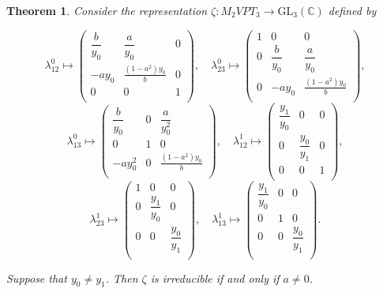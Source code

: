 \documentclass[preprint]{elsarticle}
\newtheorem{theorem}{Theorem}[section]
\begin{document}
\begin{theorem}
Consider the representation $\zeta: M_2VPT_3\longrightarrow \mathrm{GL}_{3}(\mathbb{C}) $  defined by

$$\lambda^0_{12}\mapsto\left(
\begin{array}{ccc}
 \dfrac{b}{y_0} & \dfrac{a}{y_0} & 0 \\
 -ay_0 & \frac{\left(1-a^2\right) y_0}{b} & 0 \\
 0 & 0 & 1 \\
\end{array}
\right),\quad
\lambda^0_{23}\mapsto\left(
\begin{array}{ccc}
 1 & 0 & 0 \\
 0 & \dfrac{b}{y_0} & \dfrac{a}{y_0} \\
 0 & -a y_0 & \frac{\left(1-a^2\right) y_0}{b} \\
\end{array}
\right),$$
$$\lambda^0_{13}\mapsto
\left(
\begin{array}{ccc}
 \dfrac{b}{y_0} & 0 & \dfrac{a}{y_0^2} \\
 0 & 1 & 0 \\
 -a y_0^2 & 0 & \frac{\left(1-a^2\right) y_0}{b} \\
\end{array}
\right), \quad
\lambda^1_{12}\mapsto
\left(
\begin{array}{ccc}
 \dfrac{y_1}{y_0} & 0 & 0 \\
 0 & \dfrac{y_0}{y_1} & 0 \\
 0 & 0 & 1 \\
\end{array}
\right),$$
$$\lambda^1_{23}\mapsto
\left(
\begin{array}{ccc}
 1 & 0 & 0 \\
 0 & \dfrac{y_1}{y_0} & 0 \\
 0 & 0 & \dfrac{y_0}{y_1} \\
\end{array}
\right),\quad 
\lambda^1_{13}\mapsto
\left(
\begin{array}{ccc}
 \dfrac{y_1}{y_0} & 0 & 0 \\
 0 & 1 & 0 \\
 0 & 0 & \dfrac{y_0}{y_1} \\
\end{array}
\right).$$

Suppose that $y_0\neq y_1$. 
Then $\zeta$  is irreducible if and only if $a\neq 0$.
     
\end{theorem}
\end{document}
